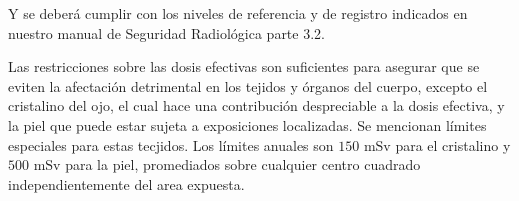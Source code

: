 Y se deberá cumplir con los niveles de referencia y de registro indicados en nuestro manual de Seguridad Radiológica parte 3.2.

Las restricciones sobre las dosis efectivas son suficientes para asegurar que se eviten la afectación detrimental en los tejidos y órganos del cuerpo, excepto el cristalino del ojo, el cual hace una contribución despreciable a la dosis efectiva, y la piel que puede estar sujeta a exposiciones localizadas. Se mencionan límites especiales para estas tecjidos. Los límites anuales son $150 \text{ mSv}$ para el cristalino y $500 \text{ mSv}$ para la piel, promediados sobre cualquier centro cuadrado independientemente del area expuesta.
